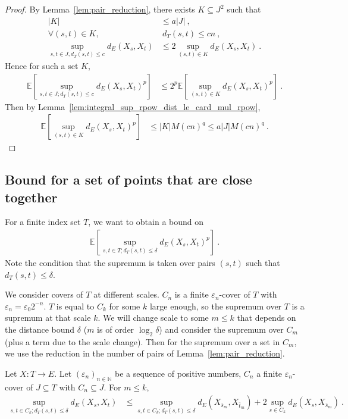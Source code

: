 \begin{proof}\leanok
By Lemma~\ref{lem:pair_reduction}, there exists $K \subseteq J^2$ such that
\begin{align*}
  |K|
  & \le a |J|
  \:, \\
  \forall (s,t) \in K,
  & \ d_T(s,t) \le c n
  \:, \\
  \sup_{s,t\in J, d_T(s,t) \le c} d_E(X_s, X_t)
  & \le 2 \sup_{(s,t) \in K} d_E(X_s, X_t)
  \: .
\end{align*}
Hence for such a set $K$,
\begin{align*}
  \mathbb{E} \left[ \sup_{s, t \in J; d_T(s, t) \le c} d_E(X_s, X_t)^p \right]
  &\le 2^p \mathbb{E} \left[ \sup_{(s, t) \in K} d_E(X_s, X_t)^p \right]
  \: .
\end{align*}
Then by Lemma~\ref{lem:integral_sup_rpow_dist_le_card_mul_rpow},
\begin{align*}
  \mathbb{E} \left[ \sup_{(s, t) \in K} d_E(X_s, X_t)^p \right]
  &\le |K| M (cn)^q
  \le a |J| M (cn)^q
  \: .
\end{align*}
\end{proof}


\subsection{Bound for a set of points that are close together}

For a finite index set $T$, we want to obtain a bound on
\begin{align*}
  \mathbb{E}\left[ \sup_{s, t \in T; d_T(s, t) \le \delta} d_E(X_s, X_t)^p \right] \: .
\end{align*}
Note the condition that the supremum is taken over pairs $(s, t)$ such that $d_T(s, t) \le \delta$.

We consider covers of $T$ at different scales. $C_n$ is a finite $\varepsilon_n$-cover of $T$ with $\varepsilon_n = \varepsilon_0 2^{-n}$.
$T$ is equal to $C_k$ for some $k$ large enough, so the supremum over $T$ is a supremum at that scale $k$.
We will change scale to some $m \le k$ that depends on the distance bound $\delta$ ($m$ is of order $\log_2 \delta$) and consider the supremum over $C_m$ (plus a term due to the scale change).
Then for the supremum over a set in $C_m$, we use the reduction in the number of pairs of Lemma~\ref{lem:pair_reduction}.

\begin{lemma}\label{lem:scale_change}
  \leanok
Let $X : T \to E$.
Let $(\varepsilon_n)_{n \in \mathbb{N}}$ be a sequence of positive numbers, $C_n$ a finite $\varepsilon_n$-cover of $J \subseteq T$ with $C_n \subseteq J$.
For $m \le k$,
\begin{align*}
  \sup_{s, t \in C_k; d_T(s, t) \le \delta} d_E(X_s, X_t)
  &\le \sup_{s, t \in C_k; d_T(s, t) \le \delta} d_E(X_{\bar{s}_m}, X_{\bar{t}_m})
    + 2 \sup_{s \in C_k} d_E(X_s, X_{\bar{s}_m})
  \: .
\end{align*}
\end{lemma}

